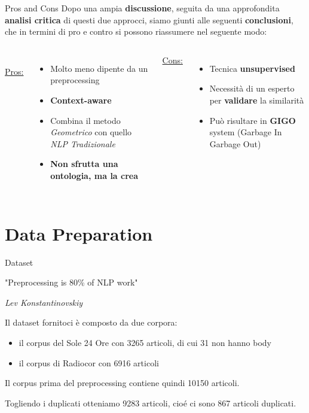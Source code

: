 \documentclass[british]{beamer}
\begin{document}
\begin{frame}{Pros and Cons}
	Dopo una ampia \textbf{discussione}, seguita da una approfondita \textbf{analisi critica} di questi due approcci, siamo giunti alle seguenti \textbf{conclusioni}, che in termini di pro e contro si possono riassumere nel seguente modo:
	\begin{columns}
		\\
		\underline{Pros:}
		\begin{itemize}
			\item Molto meno dipente da un preprocessing
			\item \textbf{Context-aware}
			\item Combina il metodo \textit{Geometrico} con quello \textit{NLP Tradizionale}
			\item \textbf{Non sfrutta una ontologia, ma la \alert{crea}} 
		\end{itemize}
		\underline{Cons:}
		\begin{itemize}
			\item Tecnica \textbf{unsupervised}
			\item Necessit\`{a} di un esperto per \textbf{validare} la similarit\`{a}
			\item Pu\`{o} risultare in \textbf{GIGO} system (Garbage In Garbage Out)
		\end{itemize}
	\end{columns}
\end{frame}
	
\section{Data Preparation}

\begin{frame}{Dataset}
	\begin{displayquote}
		"Preprocessing is 80\% of NLP work"
		 
		\begin{flushright}
			\textit{Lev Konstantinovskiy}
		\end{flushright}
	\end{displayquote}
	Il dataset fornitoci \`{e} composto da due corpora: 
	\begin{itemize}
		\item il corpus del Sole 24 Ore con 3265 articoli, di cui 31 non hanno body
		\item il corpus di Radiocor con 6916 articoli
	\end{itemize}
	Il corpus prima del preprocessing contiene quindi 10150 articoli. \par
	Togliendo i duplicati otteniamo 9283 articoli, cio\'{e} ci sono 867 articoli duplicati.
\end{frame}
\end{document}
